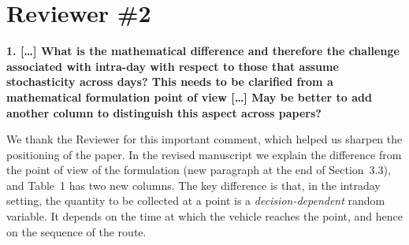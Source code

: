 \documentclass[11pt,a4paper]{article}
\newenvironment{comment}{\par\medskip\noindent\bfseries}{\par\medskip}
\begin{document}
\section*{Reviewer \#2}

\begin{comment}
1. [\dots] What is the mathematical difference and therefore the challenge associated with intra-day with respect to those that assume stochasticity across days? This needs to be clarified from a mathematical formulation point of view [\dots] May be better to add another column to distinguish this aspect across papers?
\end{comment}

We thank the Reviewer for this important comment, which helped us sharpen the positioning of the paper. In the revised manuscript we explain the difference from the point of view of the formulation (new paragraph at the end of Section~3.3), and Table~1 has two new columns. The key difference is that, in the intraday setting, the quantity to be collected at a point is a \emph{decision-dependent} random variable. It depends on the time at which the vehicle reaches the point, and hence on the sequence of the route.
\end{document}

